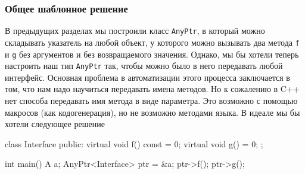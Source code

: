 \subsubsection{Общее шаблонное решение}

В предыдущих разделах мы построили класс \texttt{AnyPtr}, в который можно складывать указатель на любой объект, у которого можно вызывать два метода \texttt{f} и \texttt{g} без аргументов и без возвращаемого значения.
Однако, мы бы хотели теперь настроить наш тип \texttt{AnyPtr} так, чтобы можно было в него передавать любой интерфейс.
Основная проблема в автоматизации этого процесса заключается в том, что нам надо научиться передавать имена методов.
Но к сожалению в C++ нет способа передавать имя метода в виде параметра.
Это возможно с помощью макросов (как кодогенерация), но не возможно методами языка.
В идеале мы бы хотели следующее решение
\begin{cppcode}
class Interface {
public:
  virtual void f() const = 0;
  virtual void g() = 0;
};

int main() {
  A a;
  AnyPtr<Interface> ptr = &a;
  ptr->f();
  ptr->g();
}
\end{cppcode}
